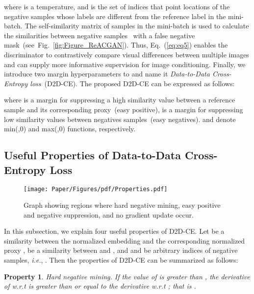 \documentclass{article}
\newtheorem{property}{Property}
\begin{document}
where  is a temperature, and  is the set of indices that point locations of the negative samples whose labels are different from the reference label  in the mini-batch. The self-similarity matrix of samples in the mini-batch is used to calculate the similarities between negative samples~ with a false negative mask~(see~Fig.~\ref{fig:Figure_ReACGAN}). 
Thus, Eq.~(\ref{eq:eq5}) enables the discriminator to contrastively compare visual differences between multiple images and can supply more informative supervision for image conditioning. Finally, we introduce two margin hyperparameters to  and name it \emph{Data-to-Data Cross-Entropy loss}~(D2D-CE). The proposed D2D-CE can be expressed as follows:

where  is a margin for suppressing a high similarity value between a reference sample and its corresponding proxy~(easy positive),  is a margin for suppressing low similarity values between negatives samples~(easy negatives).  and  denote min(,0) and max(,0) functions, respectively. 

\subsection{Useful Properties of Data-to-Data Cross-Entropy Loss}
\label{sec:Properties}
\begin{wrapfigure}{r}{0.47\textwidth}
  \vspace{-25pt}
  \begin{center}
    \texttt{[image: Paper/Figures/pdf/Properties.pdf]}
  \end{center}
  \vspace{-12pt}
  \caption{Graph showing regions where hard negative mining, easy positive and negative suppression, and no gradient update occur.}
  \vspace{-10pt}
\end{wrapfigure} In this subsection, we explain four useful properties of D2D-CE. Let  be a similarity between the normalized embedding  and the corresponding normalized proxy ,  be a similarity between  and , and  and  be arbitrary indices of negative samples, \textit{i.e.}, . Then the properties of D2D-CE can be summarized as follows:

\begin{property}
Hard negative mining.
If the value of  is greater than , the derivative of  w.r.t  is greater than or equal to the derivative w.r.t ; that is .
\end{property}
\end{document}
